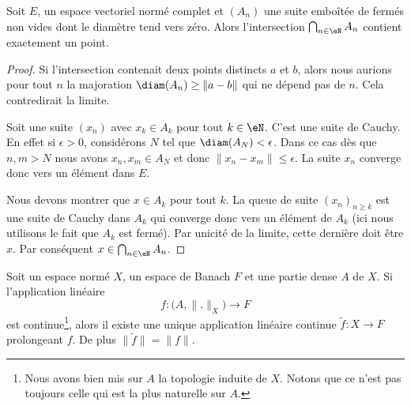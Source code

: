 \begin{lemma}   \label{LemdCOMQM}
	Soit \( E\), un espace vectoriel normé complet et \( (A_n)\) une suite emboîtée de fermés non vides dont le diamètre tend vers zéro. Alors l'intersection \( \bigcap_{n\in \eN}A_n\) contient exactement un point.
\end{lemma}

\begin{proof}
	Si l'intersection contenait deux points distincts \( a\) et \( b\), alors nous aurions pour tout \( n\) la majoration \( \diam(A_n)\geq\| a-b \|\) qui ne dépend pas de \( n\). Cela contredirait la limite.

	Soit une suite \( (x_n)\) avec \( x_k\in A_k\) pour tout \( k\in \eN\). C'est une suite de Cauchy. En effet si \( \epsilon>0\), considérons \( N\) tel que \( \diam(A_N)<\epsilon\). Dans ce cas dès que \( n,m>N\) nous avons \( x_n,x_m\in A_{N}\) et donc \( \| x_n-x_m \|\leq \epsilon\). La suite \( x_n\) converge donc vers un élément dans \( E\).

	Nous devons montrer que \( x\in A_k\) pour tout \( k\). La queue de suite \( (x_n)_{n\geq k}\) est une suite de Cauchy dans \( A_k\) qui converge donc vers un élément de \( A_k\) (ici nous utilisons le fait que \( A_k\) est fermé). Par unicité de la limite, cette dernière doit être \( x\). Par conséquent \( x\in\bigcap_{n\in \eN}A_n\).
\end{proof}


\begin{proposition} \label{PropTTiRgAq}
	Soit un espace normé \( X\), un espace de Banach \( F\) et une partie dense \( A\) de \( X\). Si l'application linéaire
	\begin{equation}
		f\colon   \big( A,\| . \|_X \big)  \to F
	\end{equation}
	est continue\footnote{Nous avons bien mis sur \( A\) la topologie induite de \( X\). Notons que ce n'est pas toujours celle qui est la plus naturelle sur \( A\).}, alors il existe une unique application linéaire continue \( \tilde f\colon X\to F\) prolongeant \( f\). De plus \( \| \tilde f \|=\| f \|\).
\end{proposition}

